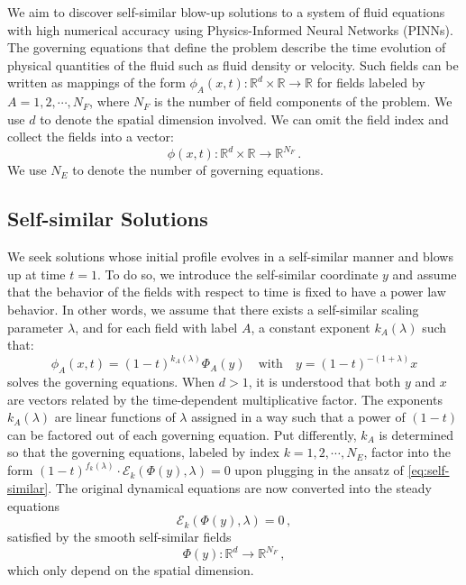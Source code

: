 \documentclass[fleqn,11pt]{wlscirep}
\begin{document}
We aim to discover self-similar blow-up solutions to a system of fluid equations with high numerical accuracy using Physics-Informed Neural Networks (PINNs). The governing equations that define the problem describe the time evolution of physical quantities of the fluid such as fluid density or velocity. Such fields can be written as mappings of the form $\phi_A(x,t): \mathbb{R}^d \times \mathbb{R} \rightarrow \mathbb{R}$ for fields labeled by $A = 1, 2, \cdots, N_F$, where $N_F$ is the number of field components of the problem. We use $d$ to denote the spatial dimension involved. We can omit the field index and collect the fields into a vector:
\begin{equation}
    \phi(x,t): \mathbb{R}^d \times \mathbb{R} \rightarrow \mathbb{R}^{N_F} \,.
\end{equation}
We use $N_E$ to denote the number of governing equations.

\subsection*{Self-similar Solutions}
\label{methods:self-similar}
We seek solutions whose initial profile evolves in a self-similar manner and blows up at time $t=1$. To do so, we introduce the self-similar coordinate $y$ and assume that the behavior of the fields with respect to time is fixed to have a power law behavior. In other words, we assume that there exists a self-similar scaling parameter $\lambda$, and for each field with label $A$, a constant exponent $k_A(\lambda)$ such that:
\begin{equation}
\label{eq:self-similar}
    \phi_A(x,t) = (1-t)^{k_A(\lambda)} \Phi_A(y) \quad \text{with}
    \quad
    y=(1-t)^{-(1+\lambda)} x 
\end{equation}
solves the governing equations. When $d > 1$, it is understood that both $y$ and $x$ are vectors related by the time-dependent multiplicative factor. The exponents $k_A(\lambda)$ are linear functions of $\lambda$ assigned in a way such that a power of $(1-t)$ can be factored out of each governing equation. Put differently, $k_A$ is determined so that the governing equations, labeled by index $k = 1, 2, \cdots, N_E$, factor into the form $(1 -t)^{f_k(\lambda)} \cdot \mathcal{E}_k (\Phi(y), \lambda) = 0$ upon plugging in the ansatz of \cref{eq:self-similar}. The original dynamical equations are now converted into the steady equations
\begin{equation}
\label{eq:self-similar-static}
 \mathcal{E}_k (\Phi(y), \lambda) = 0\,,
\end{equation}
satisfied by the smooth self-similar fields
\begin{equation}
    \Phi(y) : \mathbb{R}^d \rightarrow \mathbb{R}^{N_F} \,,
\end{equation}
which only depend on the spatial dimension.
\end{document}
